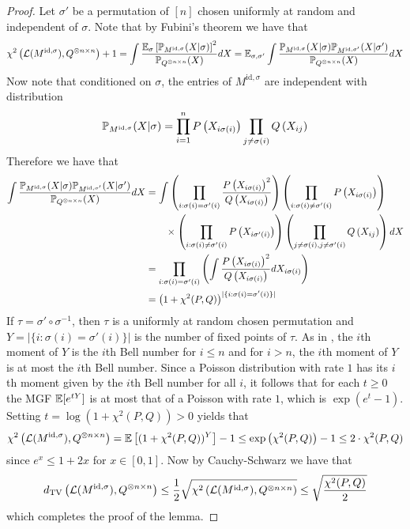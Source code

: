 \begin{proof}
Let $\sigma'$ be a permutation of $[n]$ chosen uniformly at random and independent of $\sigma$. Note that by Fubini's theorem we have that
$$\chi^2\left( \mathcal{L}(M^{\text{id}, \sigma}), Q^{\otimes n \times n} \right) + 1 = \int \frac{\mathbb{E}_\sigma \left[ \mathbb{P}_{M^{\text{id}, \sigma}} ( X | \sigma) \right]^2}{\mathbb{P}_{Q^{\otimes n \times n}}(X)} dX = \mathbb{E}_{\sigma, \sigma'} \int \frac{\mathbb{P}_{M^{\text{id}, \sigma}} ( X | \sigma) \mathbb{P}_{M^{\text{id}, \sigma'}} ( X | \sigma')}{\mathbb{P}_{Q^{\otimes n \times n}}(X)} dX$$
Now note that conditioned on $\sigma$, the entries of $M^{\text{id}, \sigma}$ are independent with distribution
$$\mathbb{P}_{M^{\text{id}, \sigma}} ( X | \sigma) = \prod_{i = 1}^n P\left(X_{i \sigma(i)} \right) \prod_{j \neq \sigma(i)} Q\left(X_{ij} \right)$$
Therefore we have that
\begin{align*}
\int \frac{\mathbb{P}_{M^{\text{id}, \sigma}} ( X | \sigma) \mathbb{P}_{M^{\text{id}, \sigma'}} ( X | \sigma')}{\mathbb{P}_{Q^{\otimes n \times n}}(X)} dX &= \int \left( \prod_{i : \sigma(i) = \sigma'(i)} \frac{P\left(X_{i\sigma(i)}\right)^2}{Q\left(X_{i\sigma(i)}\right)} \right) \left( \prod_{i : \sigma(i) \neq \sigma'(i)} P\left(X_{i\sigma(i)}\right) \right) \\
&\quad \quad \times \left( \prod_{i : \sigma(i) \neq \sigma'(i)} P\left(X_{i\sigma'(i)}\right) \right) \left( \prod_{j \neq \sigma(i), j \neq \sigma'(i)} Q\left(X_{ij}\right) \right)dX \\
&= \prod_{i : \sigma(i) = \sigma'(i)} \left( \int \frac{P\left(X_{i\sigma(i)}\right)^2}{Q\left(X_{i\sigma(i)}\right)} dX_{i\sigma(i)} \right) \\
&= \left( 1 + \chi^2(P, Q) \right)^{|\{ i : \sigma(i) = \sigma'(i) \}|}
\end{align*}
If $\tau = \sigma' \circ \sigma^{-1}$, then $\tau$ is a uniformly at random chosen permutation and $Y = |\{ i : \sigma(i) = \sigma'(i) \}|$ is the number of fixed points of $\tau$. As in \cite{pitman1997some}, the $i$th moment of $Y$ is the $i$th Bell number for $i \le n$ and for $i > n$, the $i$th moment of $Y$ is at most the $i$th Bell number. Since a Poisson distribution with rate $1$ has its $i$th moment given by the $i$th Bell number for all $i$, it follows that for each $t \ge 0$ the MGF $\mathbb{E}[e^{tY}]$ is at most that of a Poisson with rate $1$, which is $\exp(e^t - 1)$. Setting $t = \log(1 + \chi^2(P, Q)) > 0$ yields that
$$\chi^2\left( \mathcal{L}(M^{\text{id}, \sigma}), Q^{\otimes n \times n} \right) = \mathbb{E}\left[ (1 + \chi^2(P, Q))^Y \right] - 1 \le \exp\left(\chi^2(P, Q)\right) - 1 \le 2 \cdot \chi^2(P, Q)$$
since $e^x \le 1 + 2x$ for $x \in [0, 1]$. Now by Cauchy-Schwarz we have that
$$d_{\text{TV}}\left( \mathcal{L}(M^{\text{id}, \sigma}), Q^{\otimes n \times n} \right) \le \frac{1}{2} \sqrt{\chi^2\left( \mathcal{L}(M^{\text{id}, \sigma}), Q^{\otimes n \times n} \right)} \le \sqrt{\frac{\chi^2(P, Q)}{2}}$$
which completes the proof of the lemma.
\end{proof}

